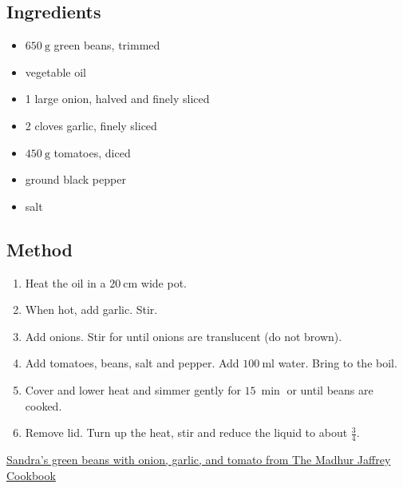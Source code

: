 \documentclass[11pt,a4paper]{article}
\begin{document}
\subsection*{Ingredients}

\begin{itemize}
  \item $ \qty{650}{\gram} $ green beans, trimmed
  \item vegetable oil
  \item 1 large onion, halved and finely sliced
  \item 2 cloves garlic, finely sliced
  \item $ \qty{450}{\gram} $ tomatoes, diced
  \item ground black pepper
  \item salt
\end{itemize}

\medskip

\subsection*{Method}

\begin{enumerate}
  \item Heat the oil in a $ \qty{20}{\cm} $ wide pot.
  \item When hot, add garlic. Stir. 
  \item Add onions. Stir for until onions are translucent (do not brown).
  \item Add tomatoes, beans, salt and pepper. Add $ \qty{100}{\ml} $ water. Bring to the boil.
  \item Cover and lower heat and simmer gently for $ \qty{15}{\min} $ or until beans are cooked.
  \item Remove lid. Turn up the heat, stir and reduce the liquid to about $ \frac{3}{4} $.
\end{enumerate}

\href{https://www.eatyourbooks.com/library/recipes/66673/sandras-green-beans-with-onion}{Sandra's green beans with onion, garlic, and tomato from The Madhur Jaffrey Cookbook}
\end{document}
